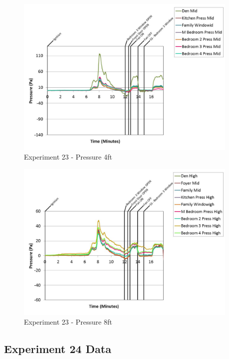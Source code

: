 \documentclass{article}
\begin{document}
\begin{appendices}
	\clearpage

	\begin{figure}[h!]
		\centering
		\includegraphics[height=3.05in]{0_Images/Results_Charts/Exp_23_Charts/Pressure4ft.pdf}
		\caption{Experiment 23 - Pressure 4ft}
	\end{figure}
 

	\begin{figure}[h!]
		\centering
		\includegraphics[height=3.05in]{0_Images/Results_Charts/Exp_23_Charts/Pressure8ft.pdf}
		\caption{Experiment 23 - Pressure 8ft}
	\end{figure}
 
	\clearpage

		\clearpage
\clearpage		\large
\subsection{Experiment 24 Data} \label{App:Exp24Results} 


\end{appendices}
\end{document}

